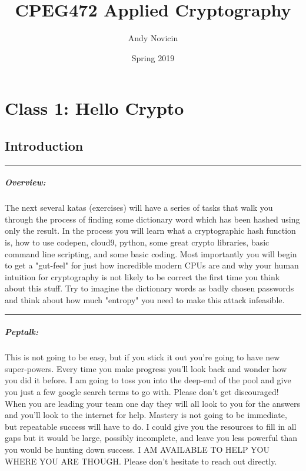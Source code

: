 \documentclass[12pt]{book}
\newenvironment{overview}
  {\noindent\rule{\textwidth}{0.4pt}
  \paragraph{Overview:}
  }
  {\par
  \noindent\rule{\textwidth}{0.4pt}
  }
\begin{document}
\raggedbottom
\setlength{\parskip}{0pt}

\title{CPEG472 Applied Cryptography}
\author{Andy Novicin}
\date{Spring 2019}

\maketitle

\chapter{Class 1: Hello Crypto}

\section{Introduction}

\begin{overview}
The next several katas (exercises) will have a series of tasks that walk you through the process of finding some dictionary word which has been hashed using only the result. In the process you will learn what a cryptographic hash function is, how to use codepen, cloud9, python, some great crypto libraries, basic command line scripting, and some basic coding. Most importantly you will begin to get a "gut-feel" for just how incredible modern CPUs are and why your human intuition for cryptography is not likely to be correct the first time you think about this stuff. Try to imagine the dictionary words as badly chosen passwords and think about how much "entropy" you need to make this attack infeasible.
\end{overview}

\paragraph{Peptalk:}
 This is not going to be easy, but if you stick it out you're going to have new super-powers. Every time you make progress you'll look back and wonder how you did it before. I am going to toss you into the deep-end of the pool and give you just a few google search terms to go with. Please don't get discouraged! When you are leading your team one day they will all look to you for the answers and you'll look to the internet for help. Mastery is not going to be immediate, but repeatable success will have to do. I could give you the resources to fill in all gaps but it would be large, possibly incomplete, and leave you less powerful than you would be hunting down success. I AM AVAILABLE TO HELP YOU WHERE YOU ARE THOUGH. Please don't hesitate to reach out directly.
 \newpage
\end{document}
